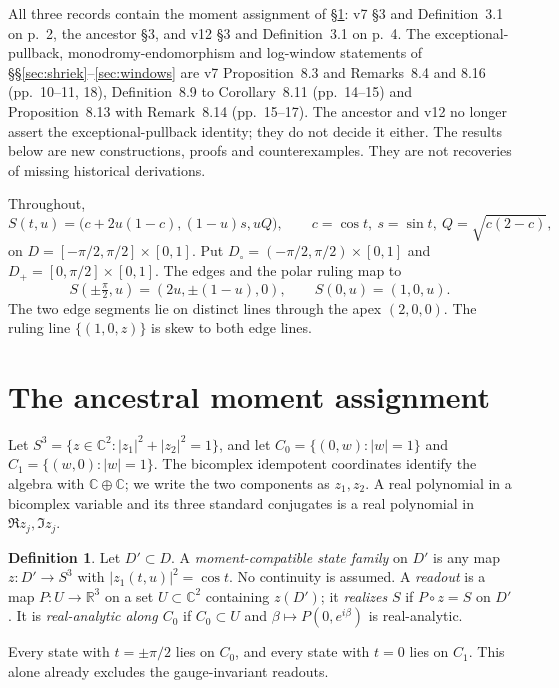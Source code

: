 \documentclass[11pt]{article}
\theoremstyle{definition}\newtheorem{definition}[theorem]{Definition}
\theoremstyle{remark}\newtheorem{remark}[theorem]{Remark}
\newcommand{\R}{\mathbb R}\newcommand{\C}{\mathbb C}\newcommand{\Z}{\mathbb Z}
\begin{document}
All three records contain the moment assignment of \S\ref{sec:moment}: v7
\S3 and Definition~3.1 on p.~2, the ancestor \S3, and v12 \S3 and
Definition~3.1 on p.~4. The exceptional-pullback,
monodromy-endomorphism and log-window statements of
\S\S\ref{sec:shriek}--\ref{sec:windows} are v7 Proposition~8.3 and
Remarks~8.4 and 8.16 (pp.~10--11, 18), Definition~8.9 to Corollary~8.11
(pp.~14--15) and Proposition~8.13 with Remark~8.14 (pp.~15--17). The ancestor
and v12 no longer assert the exceptional-pullback identity; they do not decide
it either. The results below are new constructions, proofs and counterexamples.
They are not recoveries of missing historical derivations.

Throughout,
\[
 S(t,u)=\bigl(c+2u(1-c),(1-u)s,uQ\bigr),\qquad
 c=\cos t,\ s=\sin t,\ Q=\sqrt{c(2-c)},
\]
on $D=[-\pi/2,\pi/2]\times[0,1]$. Put $D_\circ=(-\pi/2,\pi/2)\times[0,1]$ and
$D_+=[0,\pi/2]\times[0,1]$. The edges and the polar ruling map to
\begin{equation}\label{eq:edges}
 S(\pm\tfrac\pi2,u)=(2u,\pm(1-u),0),\qquad S(0,u)=(1,0,u).
\end{equation}
The two edge segments lie on distinct lines through the apex $(2,0,0)$. The
ruling line $\{(1,0,z)\}$ is skew to both edge lines.

\section{The ancestral moment assignment}\label{sec:moment}
Let $S^3=\{z\in\C^2:|z_1|^2+|z_2|^2=1\}$, and let
$C_0=\{(0,w):|w|=1\}$ and $C_1=\{(w,0):|w|=1\}$. The bicomplex idempotent
coordinates identify the algebra with $\C\oplus\C$; we write the two components
as $z_1,z_2$. A real polynomial in a bicomplex variable and its three standard
conjugates is a real polynomial in $\Re z_j,\Im z_j$.

\begin{definition}\label{def:moment}
Let $D'\subset D$. A \emph{moment-compatible state family} on $D'$ is any map
$z:D'\to S^3$ with $|z_1(t,u)|^2=\cos t$. No continuity is assumed. A
\emph{readout} is a map $P:U\to\R^3$ on a set $U\subset\C^2$ containing $z(D')$;
it \emph{realizes} $S$ if $P\circ z=S$ on $D'$. It is \emph{real-analytic along
$C_0$} if $C_0\subset U$ and $\beta\mapsto P(0,e^{i\beta})$ is real-analytic.
\end{definition}

Every state with $t=\pm\pi/2$ lies on $C_0$, and every state with $t=0$ lies on
$C_1$. This alone already excludes the gauge-invariant readouts.
\end{document}
